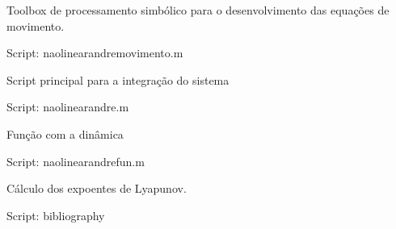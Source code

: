 \documentclass[sublist]{fei}
\begin{document}
Toolbox de processamento simbólico para o desenvolvimento das equações de movimento.

	Script: naolinearandremovimento.m

Script principal para a integração do sistema

	Script: naolinearandre.m

Função com a dinâmica

	Script: naolinearandrefun.m

Cálculo dos expoentes de Lyapunov.

	Script: bibliography






%

\end{document}
